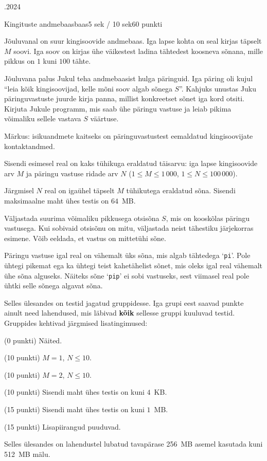 \documentclass[a4paper,11pt]{article}
\begin{document}
\begin{ol}{\eio}{.2024}{\yle}{}
\begin{yl}{5}{Kingituste andmebaas}{baas}{5 sek / 10 sek}{60 punkti}

Jõuluvanal on suur kingisoovide andmebaas. Iga lapse kohta on seal kirjas täpselt $M$ soovi. Iga soov on kirjas ühe väikestest ladina tähtedest koosneva sõnana, mille pikkus on $1$ kuni $100$ tähte.

Jõuluvana palus Jukul teha andmebaasist hulga päringuid. Iga päring oli kujul ``leia kõik kingisoovijad, kelle mõni soov algab sõnega $S$''. Kahjuks unustas Juku päringuvastuste juurde kirja panna, millist konkreetset sõnet iga kord otsiti. Kirjuta Jukule programm, mis saab ühe päringu vastuse ja leiab pikima võimaliku sellele vastava $S$ väärtuse.

Märkus: isikuandmete kaitseks on päringuvastustest eemaldatud kingisoovijate kontaktandmed.

\sis Sisendi esimesel real on kaks tühikuga eraldatud täisarvu: iga lapse kingisoovide arv $M$ ja päringu vastuse ridade arv $N$ ($1 \le M \le 1\,000$, $1 \le N \le 100\,000$).

Järgmisel $N$ real on igaühel täpselt $M$ tühikutega eraldatud sõna. Sisendi maksimaalne maht ühes testis on $64$~MB.

\val Väljastada suurima võimaliku pikkusega otsisõna $S$, mis on kooskõlas päringu vastusega. Kui sobivaid otsisõnu on mitu, väljastada neist tähestiku järjekorras esimene. Võib eeldada, et vastus on mittetühi sõne.

\ndex[0]{12cm}

Päringu vastuse igal real on vähemalt üks sõna, mis algab tähtedega `\verb/pi/'. Pole ühtegi pikemat ega ka ühtegi teist kahetähelist sõnet, mis oleks igal real vähemalt ühe sõna alguseks. Näiteks sõne `\verb/pip/' ei sobi vastuseks, sest viimasel real pole ühtki selle sõnega algavat sõna.

\ndex[1]{12cm}

\hnd Selles ülesandes on testid jagatud gruppidesse. Iga grupi eest saavad punkte ainult need lahendused, mis läbivad \textbf{kõik} sellesse gruppi kuuluvad testid. Gruppides kehtivad järgmised lisatingimused:
\begin{xenum}
  \item (0 punkti) Näited.
  \item (10 punkti) $M = 1$, $N \le 10$.
  \item (10 punkti) $M = 2$, $N \le 10$.
  \item (10 punkti) Sisendi maht ühes testis on kuni $4$~KB.
  \item (15 punkti) Sisendi maht ühes testis on kuni $1$~MB.
  \item (15 punkti) Lisapiirangud puuduvad.
\end{xenum}

Selles ülesandes on lahendustel lubatud tavapärase 256~MB asemel kasutada kuni 512~MB mälu.

\end{yl}
\end{ol}
\end{document}
